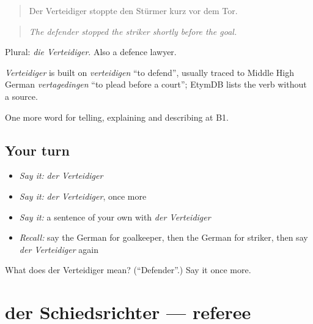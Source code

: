 \begin{quote}
Der Verteidiger stoppte den Stürmer kurz vor dem Tor.
\end{quote}

\begin{quote}
\emph{The defender stopped the striker shortly before the goal.}
\end{quote}

Plural: \emph{die Verteidiger}. Also a defence lawyer.

\begin{cousinweb}
\emph{Verteidiger} is built on \emph{verteidigen} \textquotedblleft{}to defend\textquotedblright{}, usually traced to Middle High German \emph{vertagedingen} \textquotedblleft{}to plead before a court\textquotedblright{}; EtymDB lists the verb without a source.
\end{cousinweb}

\begin{grammarlens}[title={What you've built}]
One more word for telling, explaining and describing at B1.
\end{grammarlens}

\subsection*{Your turn}
\begin{itemize}
\raggedright
  \item \emph{Say it:} \emph{der Verteidiger}
  \item \emph{Say it:} \emph{der Verteidiger}, once more
  \item \emph{Say it:} a sentence of your own with \emph{der Verteidiger}
  \item \emph{Recall:} say the German for goalkeeper, then the German for striker, then say \emph{der Verteidiger} again
\end{itemize}

\begin{tcolorbox}[breakable,colback=teal!4,colframe=teal!35!black,title={Before you move on}]
What does der Verteidiger mean? (\textquotedblleft{}Defender\textquotedblright{}.) Say it once more.
\end{tcolorbox}
\section[der Schiedsrichter]{der Schiedsrichter — referee}

\label{lesson:GE-C506-schiedsrichter}



